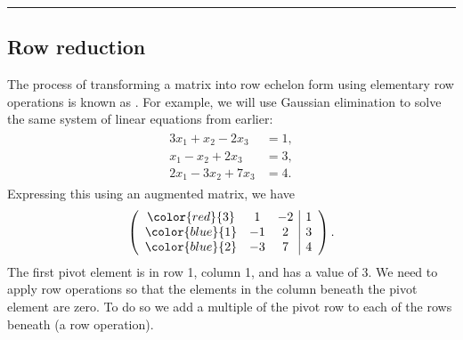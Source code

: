 \documentclass[letterpaper,10pt,english]{jupyterBook}
\begin{document}
\bigskip\hrule\bigskip


\ignorespaces 

\subsection{Row reduction}
\label{\detokenize{_pages/2.3_Gaussian_elimination:row-reduction}}\label{\detokenize{_pages/2.3_Gaussian_elimination:index-6}}
\sphinxAtStartPar
The process of transforming a matrix into row echelon form using elementary row operations is known as . For example, we will use Gaussian elimination to solve the same system of linear equations from earlier:
\begin{equation*}
\begin{split} \begin{align*}
    3x_1 + x_2 - 2x_3 &= 1, \\
    x_1 - x_2 + 2x_3 &= 3, \\
    2x_1 - 3x_2 + 7x_3 &= 4.
\end{align*} \end{split}
\end{equation*}
\sphinxAtStartPar
Expressing this using an augmented matrix, we have
\begin{equation*}
\begin{split} \left( \begin{array}{ccc|c}
        \color{red}{3} & 1 & -2 & 1 \\
        \color{blue}{1} & -1 & 2 & 3 \\
        \color{blue}{2} & -3 & 7 & 4
    \end{array} \right). \end{split}
\end{equation*}
\sphinxAtStartPar
The first pivot element is in row 1, column 1, and has a value of 3. We need to apply row operations so that the elements in the column beneath the pivot element are zero. To do so we add a multiple of the pivot row to each of the rows beneath (a {\hyperref[\detokenize{_pages/2.3_Gaussian_elimination:ero-definition}]{}} row operation).
\end{document}
